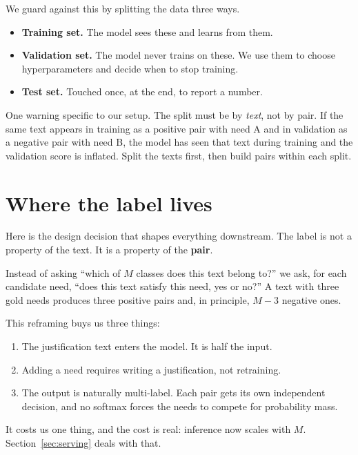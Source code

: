 \documentclass[11pt]{article}
\begin{document}
We guard against this by splitting the data three ways.

\begin{itemize}
  \item \textbf{Training set.} The model sees these and learns from them.
  \item \textbf{Validation set.} The model never trains on these. We use them to
        choose hyperparameters and decide when to stop training.
  \item \textbf{Test set.} Touched once, at the end, to report a number.
\end{itemize}

One warning specific to our setup. The split must be by \emph{text}, not by
pair. If the same text appears in training as a positive pair with need A and in
validation as a negative pair with need B, the model has seen that text during
training and the validation score is inflated. Split the texts first, then build
pairs within each split.

\section{Where the label lives}

Here is the design decision that shapes everything downstream. The label is not
a property of the text. It is a property of the \textbf{pair}.

Instead of asking ``which of $M$ classes does this text belong to?'' we ask, for
each candidate need, ``does this text satisfy this need, yes or no?'' A text with
three gold needs produces three positive pairs and, in principle, $M-3$ negative
ones.

This reframing buys us three things:

\begin{enumerate}
  \item The justification text enters the model. It is half the input.
  \item Adding a need requires writing a justification, not retraining.
  \item The output is naturally multi-label. Each pair gets its own independent
        decision, and no softmax forces the needs to compete for probability
        mass.
\end{enumerate}

It costs us one thing, and the cost is real: inference now scales with $M$.
Section~\ref{sec:serving} deals with that.
\end{document}
